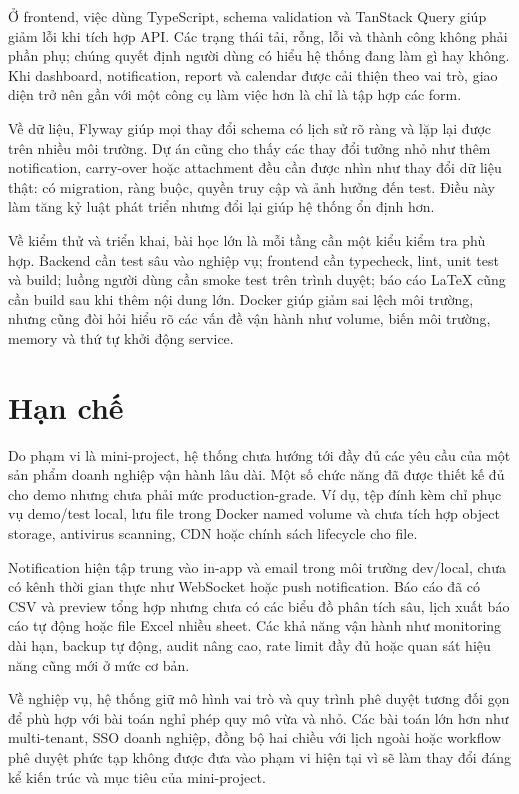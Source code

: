Ở frontend, việc dùng TypeScript, schema validation và TanStack Query giúp giảm lỗi khi tích hợp API. Các trạng thái tải, rỗng, lỗi và thành công không phải phần phụ; chúng quyết định người dùng có hiểu hệ thống đang làm gì hay không. Khi dashboard, notification, report và calendar được cải thiện theo vai trò, giao diện trở nên gần với một công cụ làm việc hơn là chỉ là tập hợp các form.

Về dữ liệu, Flyway giúp mọi thay đổi schema có lịch sử rõ ràng và lặp lại được trên nhiều môi trường. Dự án cũng cho thấy các thay đổi tưởng nhỏ như thêm notification, carry-over hoặc attachment đều cần được nhìn như thay đổi dữ liệu thật: có migration, ràng buộc, quyền truy cập và ảnh hưởng đến test. Điều này làm tăng kỷ luật phát triển nhưng đổi lại giúp hệ thống ổn định hơn.

Về kiểm thử và triển khai, bài học lớn là mỗi tầng cần một kiểu kiểm tra phù hợp. Backend cần test sâu vào nghiệp vụ; frontend cần typecheck, lint, unit test và build; luồng người dùng cần smoke test trên trình duyệt; báo cáo LaTeX cũng cần build sau khi thêm nội dung lớn. Docker giúp giảm sai lệch môi trường, nhưng cũng đòi hỏi hiểu rõ các vấn đề vận hành như volume, biến môi trường, memory và thứ tự khởi động service.

\section{Hạn chế}
Do phạm vi là mini-project, hệ thống chưa hướng tới đầy đủ các yêu cầu của một sản phẩm doanh nghiệp vận hành lâu dài. Một số chức năng đã được thiết kế đủ cho demo nhưng chưa phải mức production-grade. Ví dụ, tệp đính kèm chỉ phục vụ demo/test local, lưu file trong Docker named volume và chưa tích hợp object storage, antivirus scanning, CDN hoặc chính sách lifecycle cho file.

Notification hiện tập trung vào in-app và email trong môi trường dev/local, chưa có kênh thời gian thực như WebSocket hoặc push notification. Báo cáo đã có CSV và preview tổng hợp nhưng chưa có các biểu đồ phân tích sâu, lịch xuất báo cáo tự động hoặc file Excel nhiều sheet. Các khả năng vận hành như monitoring dài hạn, backup tự động, audit nâng cao, rate limit đầy đủ hoặc quan sát hiệu năng cũng mới ở mức cơ bản.

Về nghiệp vụ, hệ thống giữ mô hình vai trò và quy trình phê duyệt tương đối gọn để phù hợp với bài toán nghỉ phép quy mô vừa và nhỏ. Các bài toán lớn hơn như multi-tenant, SSO doanh nghiệp, đồng bộ hai chiều với lịch ngoài hoặc workflow phê duyệt phức tạp không được đưa vào phạm vi hiện tại vì sẽ làm thay đổi đáng kể kiến trúc và mục tiêu của mini-project.


